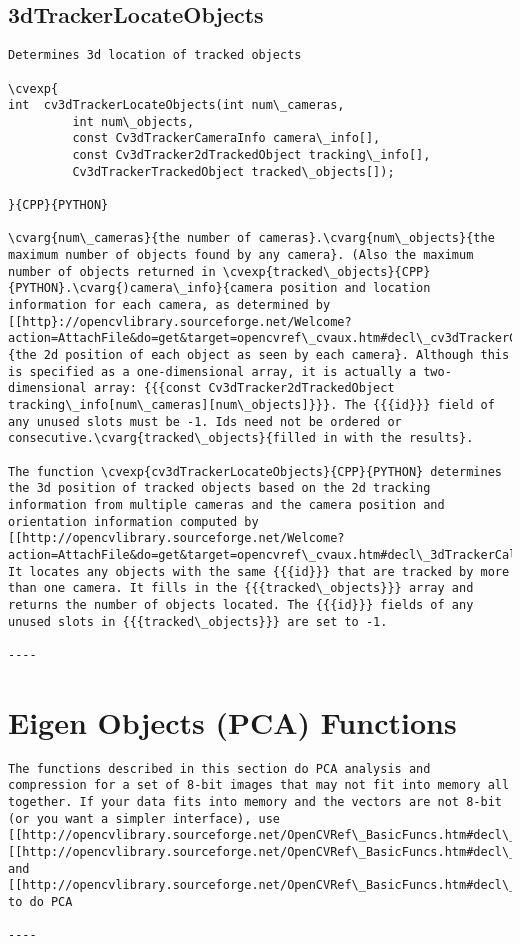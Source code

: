 \subsection{3dTrackerLocateObjects}
\begin{verbatim}
Determines 3d location of tracked objects

\cvexp{
int  cv3dTrackerLocateObjects(int num\_cameras,
         int num\_objects,
         const Cv3dTrackerCameraInfo camera\_info[],
         const Cv3dTracker2dTrackedObject tracking\_info[],
         Cv3dTrackerTrackedObject tracked\_objects[]);

}{CPP}{PYTHON}

\cvarg{num\_cameras}{the number of cameras}.\cvarg{num\_objects}{the maximum number of objects found by any camera}. (Also the maximum number of objects returned in \cvexp{tracked\_objects}{CPP}{PYTHON}.\cvarg{)camera\_info}{camera position and location information for each camera, as determined by [[http}://opencvlibrary.sourceforge.net/Welcome?action=AttachFile&do=get&target=opencvref\_cvaux.htm#decl\_cv3dTrackerCalibrateCameras|3dTrackerCalibrateCameras]].\cvarg{tracking\_info}{the 2d position of each object as seen by each camera}. Although this is specified as a one-dimensional array, it is actually a two-dimensional array: {{{const Cv3dTracker2dTrackedObject tracking\_info[num\_cameras][num\_objects]}}}. The {{{id}}} field of any unused slots must be -1. Ids need not be ordered or consecutive.\cvarg{tracked\_objects}{filled in with the results}.

The function \cvexp{cv3dTrackerLocateObjects}{CPP}{PYTHON} determines the 3d position of tracked objects based on the 2d tracking information from multiple cameras and the camera position and orientation information computed by [[http://opencvlibrary.sourceforge.net/Welcome?action=AttachFile&do=get&target=opencvref\_cvaux.htm#decl\_3dTrackerCalibrateCameras|3dTrackerCalibrateCameras]]. It locates any objects with the same {{{id}}} that are tracked by more than one camera. It fills in the {{{tracked\_objects}}} array and returns the number of objects located. The {{{id}}} fields of any unused slots in {{{tracked\_objects}}} are set to -1.

----
\end{verbatim}
\section{Eigen Objects (PCA) Functions}
\begin{verbatim}
The functions described in this section do PCA analysis and compression for a set of 8-bit images that may not fit into memory all together. If your data fits into memory and the vectors are not 8-bit (or you want a simpler interface), use [[http://opencvlibrary.sourceforge.net/OpenCVRef\_BasicFuncs.htm#decl\_cvCalcCovarMatrix|cvCalcCovarMatrix]], [[http://opencvlibrary.sourceforge.net/OpenCVRef\_BasicFuncs.htm#decl\_cvSVD|cvSVD]] and [[http://opencvlibrary.sourceforge.net/OpenCVRef\_BasicFuncs.htm#decl\_cvGEMM|cvGEMM]] to do PCA

----
\end{verbatim}
